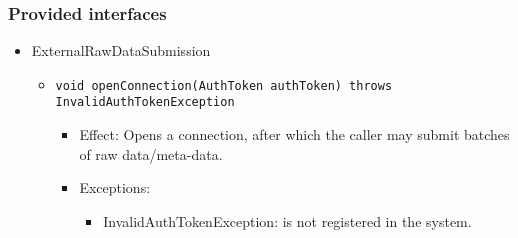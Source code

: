 \subsubsection*{Provided interfaces}
\begin{itemize}
    \item ExternalRawDataSubmission
	\begin{itemize}
		\item \texttt{void openConnection(AuthToken authToken) throws InvalidAuthTokenException}
			 \begin{itemize}
				 \item Effect: Opens a connection, after which the caller may submit batches of raw data/meta-data.
		         \item Exceptions:
		            \begin{itemize}
		                \item InvalidAuthTokenException:  is not registered in the system.
		            \end{itemize}
		     \end{itemize}


\end{itemize}
\end{itemize}
